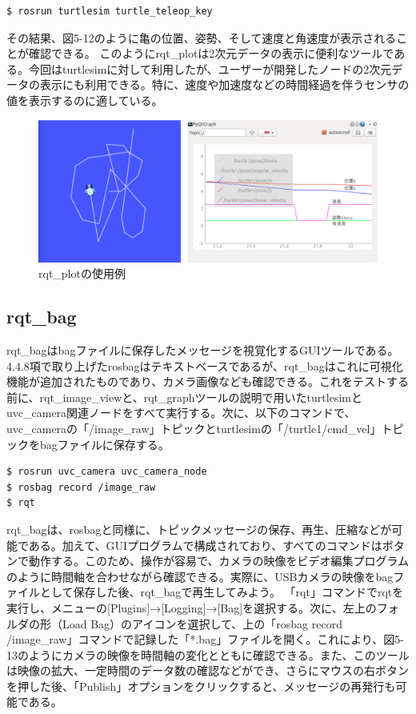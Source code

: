 \begin{lstlisting}[language=ROS]
$ rosrun turtlesim turtle_teleop_key
\end{lstlisting}

その結果、図5-12のように亀の位置、姿勢、そして速度と角速度が表示されることが確認できる。
このようにrqt\_plotは2次元データの表示に便利なツールである。今回はturtlesimに対して利用したが、ユーザーが開発したノードの2次元データの表示にも利用できる。特に、速度や加速度などの時間経過を伴うセンサの値を表示するのに適している。

\begin{figure}[h]
  \centering
  \includegraphics[width=\columnwidth]{pictures/chapter5/pic_05_12.png}
  \caption{rqt\_plotの使用例}
\end{figure}

\subsection{rqt\_bag}

rqt\_bagはbagファイルに保存したメッセージを視覚化するGUIツールである。4.4.8項で取り上げたrosbagはテキストベースであるが、rqt\_bagはこれに可視化機能が追加されたものであり、カメラ画像なども確認できる。これをテストする前に、rqt\_image\_viewと、rqt\_graphツールの説明で用いたturtlesimとuvc\_camera関連ノードをすべて実行する。次に、以下のコマンドで、uvc\_cameraの「/image\_raw」トピックとturtlesimの「/turtle1/cmd\_vel」トピックをbagファイルに保存する。

\begin{lstlisting}[language=ROS]
$ rosrun uvc_camera uvc_camera_node
$ rosbag record /image_raw
$ rqt
\end{lstlisting}

rqt\_bagは、rosbagと同様に、トピックメッセージの保存、再生、圧縮などが可能である。加えて、GUIプログラムで構成されており、すべてのコマンドはボタンで動作する。このため、操作が容易で、カメラの映像をビデオ編集プログラムのように時間軸を合わせながら確認できる。実際に、USBカメラの映像をbagファイルとして保存した後、rqt\_bagで再生してみよう。
「rqt」コマンドでrqtを実行し、メニューの[Plugins]→[Logging]→[Bag]を選択する。次に、左上のフォルダの形（Load Bag）のアイコンを選択して、上の「rosbag record /image\_raw」コマンドで記録した「*.bag」ファイルを開く。これにより、図5-13のようにカメラの映像を時間軸の変化とともに確認できる。また、このツールは映像の拡大、一定時間のデータ数の確認などができ、さらにマウスの右ボタンを押した後、「Publish」オプションをクリックすると、メッセージの再発行も可能である。

